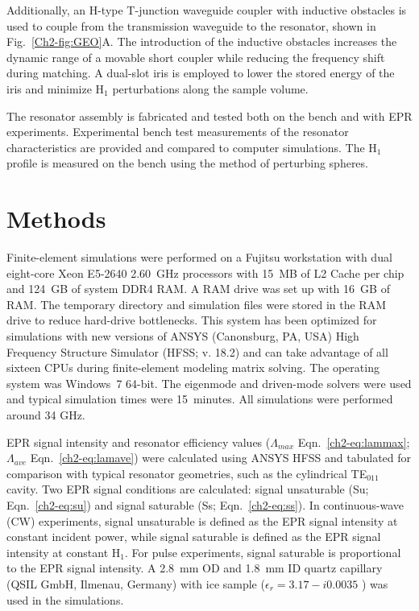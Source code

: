 Additionally, an H-type T-junction waveguide coupler with inductive obstacles is used to couple from the transmission waveguide to the resonator, shown in Fig.~\ref{Ch2-fig:GEO}A. The introduction of the inductive obstacles increases the dynamic range of a movable short coupler while reducing the frequency shift during matching. A dual-slot iris is employed to lower the stored energy of the iris and minimize H$_1$ perturbations along the sample volume. \cite{UFLGR2017}

The resonator assembly is fabricated and tested both on the bench and with EPR experiments. Experimental bench test measurements of the resonator characteristics are provided and compared to computer simulations. The H$_1$ profile is measured on the bench using the method of perturbing spheres. 

\section{Methods}
Finite-element simulations were performed on a Fujitsu workstation with dual eight-core Xeon E5-2640 2.60~GHz processors with 15~MB of L2 Cache per chip and 124~GB of system DDR4 RAM. A RAM drive was set up with 16~GB of RAM. The temporary directory and simulation files were stored in the RAM drive to reduce hard-drive bottlenecks. This system has been optimized for simulations with new versions of ANSYS (Canonsburg, PA, USA) High Frequency Structure Simulator (HFSS; v. 18.2) and can take advantage of all sixteen CPUs during finite-element modeling matrix solving. The operating system was Windows~7 64-bit. The eigenmode and driven-mode solvers were used and typical simulation times were 15~minutes. All simulations were performed around 34 GHz.

EPR signal intensity and resonator efficiency values ($\Lambda_{max}$ Eqn.~\ref{ch2-eq:lammax}; $\Lambda_{ave}$ Eqn.~\ref{ch2-eq:lamave}) were calculated using ANSYS HFSS \cite{misrabook} and tabulated for comparison with typical resonator geometries, such as the cylindrical TE$_{011}$ cavity. \cite{generalte011} Two EPR signal conditions are calculated: signal unsaturable (Su; Eqn.~\ref{ch2-eq:su}) and signal saturable (Ss; Eqn.~\ref{ch2-eq:ss}). In continuous-wave (CW) experiments, signal unsaturable is defined as the EPR signal intensity at constant incident power, while signal saturable is defined as the EPR signal intensity at constant H$_1$. For pulse experiments, signal saturable is proportional to the EPR signal intensity. A 2.8~mm OD and 1.8~mm ID quartz capillary (QSIL GmbH, Ilmenau, Germany) with ice sample ($\epsilon_r=3.17-i0.0035$ \cite{icedielectric} ) was used in the simulations.


